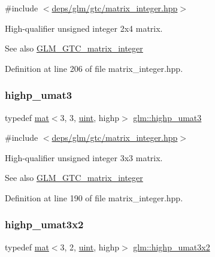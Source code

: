 {\ttfamily \#include $<$\hyperlink{matrix__integer_8hpp}{deps/glm/gtc/matrix\+\_\+integer.\+hpp}$>$}

High-\/qualifier unsigned integer 2x4 matrix. \begin{DoxySeeAlso}{See also}
\hyperlink{group__gtc__matrix__integer}{G\+L\+M\+\_\+\+G\+T\+C\+\_\+matrix\+\_\+integer} 
\end{DoxySeeAlso}


Definition at line 206 of file matrix\+\_\+integer.\+hpp.

\mbox{\label{group__gtc__matrix__integer_ga2718f6f3a37cd13e75e6839a8a5f2355}} 
\subsubsection{\texorpdfstring{highp\+\_\+umat3}{highp\_umat3}}
{\footnotesize\ttfamily typedef \hyperlink{structglm_1_1mat}{mat}$<$3, 3, \hyperlink{group__core__precision_ga4fd29415871152bfb5abd588334147c8}{uint}, highp$>$ \hyperlink{group__gtc__matrix__integer_ga2718f6f3a37cd13e75e6839a8a5f2355}{glm\+::highp\+\_\+umat3}}



{\ttfamily \#include $<$\hyperlink{matrix__integer_8hpp}{deps/glm/gtc/matrix\+\_\+integer.\+hpp}$>$}

High-\/qualifier unsigned integer 3x3 matrix. \begin{DoxySeeAlso}{See also}
\hyperlink{group__gtc__matrix__integer}{G\+L\+M\+\_\+\+G\+T\+C\+\_\+matrix\+\_\+integer} 
\end{DoxySeeAlso}


Definition at line 190 of file matrix\+\_\+integer.\+hpp.

\mbox{\label{group__gtc__matrix__integer_ga91ed05f00d470b2448e024af7e244f49}} 
\subsubsection{\texorpdfstring{highp\+\_\+umat3x2}{highp\_umat3x2}}
{\footnotesize\ttfamily typedef \hyperlink{structglm_1_1mat}{mat}$<$3, 2, \hyperlink{group__core__precision_ga4fd29415871152bfb5abd588334147c8}{uint}, highp$>$ \hyperlink{group__gtc__matrix__integer_ga91ed05f00d470b2448e024af7e244f49}{glm\+::highp\+\_\+umat3x2}}



